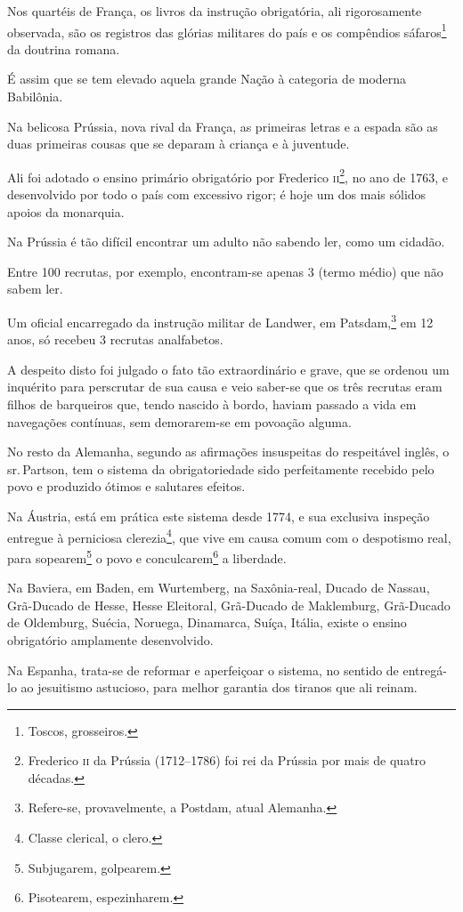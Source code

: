 Nos quartéis de França, os livros da instrução obrigatória, ali
rigorosamente observada, são os registros das glórias militares do país
e os compêndios sáfaros\footnote{Toscos, grosseiros.} da doutrina
romana.

É assim que se tem elevado aquela grande Nação à categoria de moderna
Babilônia.

Na belicosa Prússia, nova rival da França, as primeiras letras e a
espada são as duas primeiras cousas que se deparam à criança e à
juventude.

Ali foi adotado o ensino primário obrigatório por Frederico
\textsc{ii}\footnote{Frederico \textsc{ii} da Prússia (1712--1786) foi rei da Prússia por
  mais de quatro décadas.}, no ano de 1763, e desenvolvido por todo o
país com excessivo rigor; é hoje um dos mais sólidos apoios da
monarquia.

Na Prússia é tão difícil encontrar um adulto não sabendo ler, como um
cidadão.

Entre 100 recrutas, por exemplo, encontram-se apenas 3 (termo médio) que
não sabem ler.

Um oficial encarregado da instrução militar de Landwer, em
Patsdam,\footnote{Refere-se, provavelmente, a Postdam, atual Alemanha.}
em 12 anos, só recebeu 3 recrutas analfabetos.

A despeito disto foi julgado o fato tão extraordinário e grave, que se
ordenou um inquérito para perscrutar de sua causa e veio saber-se que os
três recrutas eram filhos de barqueiros que, tendo nascido à bordo,
haviam passado a vida em navegações contínuas, sem demorarem-se em
povoação alguma.

No resto da Alemanha, segundo as afirmações insuspeitas do respeitável
inglês, o sr.\,Partson, tem o sistema da obrigatoriedade sido
perfeitamente recebido pelo povo e produzido ótimos e salutares efeitos.

Na Áustria, está em prática este sistema desde 1774, e sua exclusiva
inspeção entregue à perniciosa clerezia\footnote{Classe clerical, o
  clero.}, que vive em causa comum com o despotismo real, para
sopearem\footnote{Subjugarem, golpearem.} o povo e
conculcarem\footnote{Pisotearem, espezinharem.} a liberdade.

Na Baviera, em Baden, em Wurtemberg, na Saxônia-real, Ducado de Nassau,
Grã-Ducado de Hesse, Hesse Eleitoral, Grã-Ducado de Maklemburg,
Grã-Ducado de Oldemburg, Suécia, Noruega, Dinamarca, Suíça, Itália,
existe o ensino obrigatório amplamente desenvolvido.

Na Espanha, trata-se de reformar e aperfeiçoar o sistema, no sentido de
entregá-lo ao jesuitismo astucioso, para melhor garantia dos tiranos que
ali reinam.

